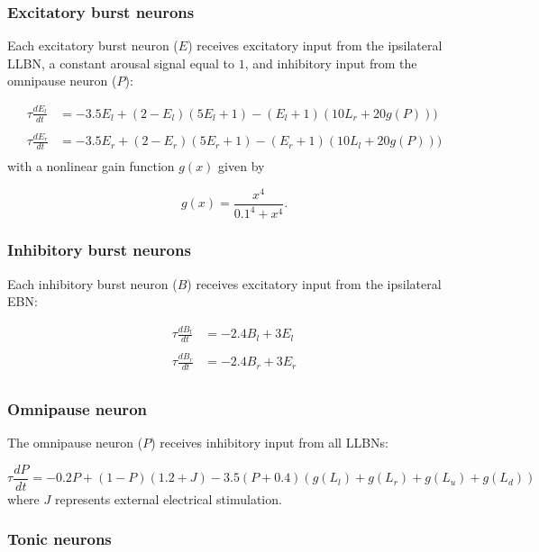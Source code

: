 \documentclass[10pt,a4paper,onecolumn]{article}
\begin{document}
\subsubsection{Excitatory burst neurons}\label{excitatory-burst-neurons}

Each excitatory burst neuron (\(E\)) receives excitatory input from the
ipsilateral LLBN, a constant arousal signal equal to \(1\), and
inhibitory input from the omnipause neuron (\(P\)):

\[
\begin{array}{ll}
\tau\frac{dE_l}{dt} &= -3.5E_l+(2-E_l)(5E_l+1)-(E_l+1)(10L_r+20g(P))) \\\\
\tau\frac{dE_r}{dt} &= -3.5E_r+(2-E_r)(5E_r+1)-(E_r+1)(10L_l+20g(P))) \\
\end{array}
\] with a nonlinear gain function \(g(x)\) given by

\[
g(x) = \frac{x^4}{0.1^4+x^4} \textrm{.}
\]

\subsubsection{Inhibitory burst neurons}\label{inhibitory-burst-neurons}

Each inhibitory burst neuron (\(B\)) receives excitatory input from the
ipsilateral EBN:

\[
\begin{array}{ll}
\tau\frac{dB_l}{dt} &= -2.4B_l+3E_l \\\\
\tau\frac{dB_r}{dt} &= -2.4B_r+3E_r \\
\end{array}
\]

\subsubsection{Omnipause neuron}\label{omnipause-neuron}

The omnipause neuron (\(P\)) receives inhibitory input from all LLBNs:

\[
\tau\frac{dP}{dt} = -0.2P+(1-P)(1.2+J)-3.5(P+0.4)(g(L_l)+g(L_r)+g(L_u)+g(L_d))
\] where \(J\) represents external electrical stimulation.

\subsubsection{Tonic neurons}\label{tonic-neurons}
\end{document}
